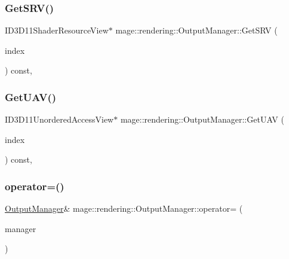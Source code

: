 \subsubsection{\texorpdfstring{Get\+S\+R\+V()}{GetSRV()}}
{\footnotesize\ttfamily I\+D3\+D11\+Shader\+Resource\+View$\ast$ mage\+::rendering\+::\+Output\+Manager\+::\+Get\+S\+RV (\begin{DoxyParamCaption}\item[{\hyperlink{classmage_1_1rendering_1_1_output_manager_a941f1b35a83ee0ce190494523ec0fe63}{S\+R\+V\+Index}}]{index }\end{DoxyParamCaption}) const\hspace{0.3cm}{\ttfamily [private]}, {\ttfamily [noexcept]}}

\hypertarget{classmage_1_1rendering_1_1_output_manager_a6eb1f3b756f121897fd869c355944e86}{}\label{classmage_1_1rendering_1_1_output_manager_a6eb1f3b756f121897fd869c355944e86} 
\subsubsection{\texorpdfstring{Get\+U\+A\+V()}{GetUAV()}}
{\footnotesize\ttfamily I\+D3\+D11\+Unordered\+Access\+View$\ast$ mage\+::rendering\+::\+Output\+Manager\+::\+Get\+U\+AV (\begin{DoxyParamCaption}\item[{\hyperlink{classmage_1_1rendering_1_1_output_manager_a71b3797fef957312f92736f15b7ada3e}{U\+A\+V\+Index}}]{index }\end{DoxyParamCaption}) const\hspace{0.3cm}{\ttfamily [private]}, {\ttfamily [noexcept]}}

\hypertarget{classmage_1_1rendering_1_1_output_manager_a7fb15ee3d3e3f7be648071ef1c6f3c6d}{}\label{classmage_1_1rendering_1_1_output_manager_a7fb15ee3d3e3f7be648071ef1c6f3c6d} 
\subsubsection{\texorpdfstring{operator=()}{operator=()}\hspace{0.1cm}{\footnotesize\ttfamily [1/2]}}
{\footnotesize\ttfamily \hyperlink{classmage_1_1rendering_1_1_output_manager}{Output\+Manager}\& mage\+::rendering\+::\+Output\+Manager\+::operator= (\begin{DoxyParamCaption}\item[{const \hyperlink{classmage_1_1rendering_1_1_output_manager}{Output\+Manager} \&}]{manager }\end{DoxyParamCaption})\hspace{0.3cm}{\ttfamily [delete]}}

